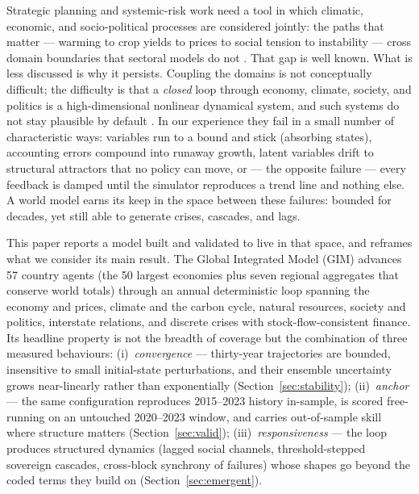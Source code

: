 \documentclass[a4paper,fleqn]{cas-sc}
\begin{document}
Strategic planning and systemic-risk work need a tool in which climatic, economic, and
socio-political processes are considered jointly: the paths that matter --- warming to crop
yields to prices to social tension to instability --- cross domain boundaries that sectoral
models do not \citep{nordhaus2017,riahi2017}. That gap is well known. What is less discussed is
why it persists. Coupling the domains is not conceptually difficult; the difficulty is that a
\emph{closed} loop through economy, climate, society, and politics is a high-dimensional
nonlinear dynamical system, and such systems do not stay plausible by default
\citep{may1972,sterman2000}. In our experience they fail in a small number of characteristic
ways: variables run to a bound and stick (absorbing states), accounting errors compound into
runaway growth, latent variables drift to structural attractors that no policy can move, or ---
the opposite failure --- every feedback is damped until the simulator reproduces a trend line
and nothing else. A world model earns its keep in the space between these failures: bounded for
decades, yet still able to generate crises, cascades, and lags.

This paper reports a model built and validated to live in that space, and reframes what we
consider its main result. The Global Integrated Model (GIM) advances 57 country agents (the 50
largest economies plus seven regional aggregates that conserve world totals) through an annual
deterministic loop spanning the economy and prices, climate and the carbon cycle, natural
resources, society and politics, interstate relations, and discrete crises with
stock-flow-consistent finance. Its headline property is not the breadth of coverage but the
combination of three measured behaviours: (i)~\emph{convergence} --- thirty-year trajectories
are bounded, insensitive to small initial-state perturbations, and their ensemble uncertainty
grows near-linearly rather than exponentially (Section~\ref{sec:stability}); (ii)~\emph{anchor}
--- the same configuration reproduces 2015--2023 history in-sample, is scored free-running on an
untouched 2020--2023 window, and carries out-of-sample skill where structure matters
(Section~\ref{sec:valid});
(iii)~\emph{responsiveness} --- the loop produces structured dynamics (lagged social channels,
threshold-stepped sovereign cascades, cross-block synchrony of failures) whose shapes go beyond the coded
terms they build on (Section~\ref{sec:emergent}).
\end{document}
